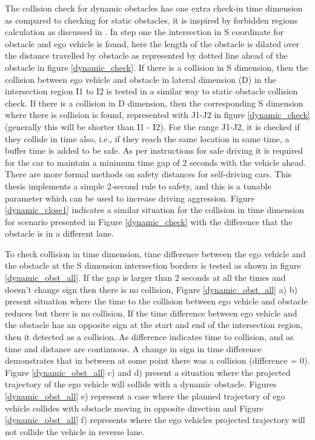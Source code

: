 The collision check for dynamic obstacles has one extra check-in time dimension as compared to checking for static obstacles, it is inspired by forbidden regions calculation as discussed in \cite{graff_thesis}. In step one the intersection in S coordinate for obstacle and ego vehicle is found, here the length of the obstacle is dilated over the distance travelled by obstacle as represented by dotted line ahead of the obstacle in figure \ref{dynamic_check}. If there is a collision in S dimension, then the collision between ego vehicle and obstacle in lateral dimension (D) in the intersection region I1 to I2 is tested in a similar way to static obstacle collision check. If there is a collision in D dimension, then the corresponding S dimension where there is collision is found, represented with J1-J2 in figure \ref{dynamic_check} (generally this will be shorter than I1 - I2). For the range J1-J2, it is checked if they collide in time also, i.e., if they reach the same location in same time, a buffer time is added to be safe. As per instructions for safe driving it is required for the car to maintain a minimum time gap of 2 seconds with the vehicle ahead. There are more formal methods \cite{mobile_eye_safety_distance} on safety distances for self-driving cars. This thesis implements a simple 2-second rule to safety, and this is a tunable parameter which can be used to increase driving aggression. Figure \ref{dynamic_close1} indicates a similar situation for the collision in time dimension for scenario presented in Figure \ref{dynamic_check} with the difference that the obstacle is in a different lane.

To check collision in time dimension, time difference between the ego vehicle and the obstacle at the S dimension intersection borders is tested as shown in figure \ref{dynamic_obst_all}. If the gap is larger than 2 seconds at all the times and doesn't change sign then there is no collision, Figure \ref{dynamic_obst_all} a) b) present situation where the time to the collision between ego vehicle and obstacle reduces but there is no collision. If the time difference between ego vehicle and the obstacle has an opposite sign at the start and end of the intersection region, then it detected as a collision. As difference indicates time to collision, and as time and distance are continuous. A change in sign in time difference demonstrates that in between at some point there was a collision (difference = 0). Figure \ref{dynamic_obst_all} c) and d) present a situation where the projected trajectory of the ego vehicle will collide with a dynamic obstacle. Figures \ref{dynamic_obst_all} e) represent a case where the planned trajectory of ego vehicle collides with obstacle moving in opposite direction and Figure \ref{dynamic_obst_all} f) represents where the ego vehicles projected trajectory will not collide the vehicle in reverse lane.

